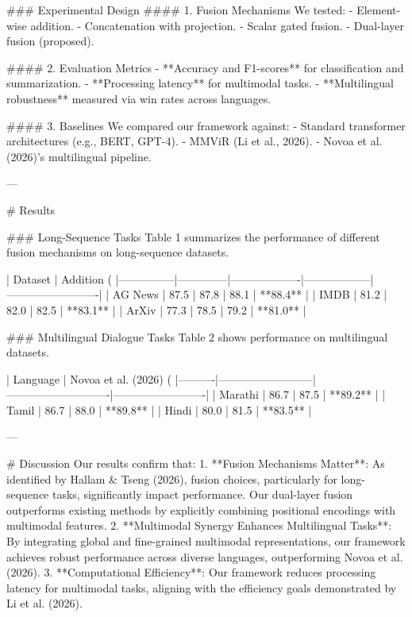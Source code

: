 ### Experimental Design  
#### 1. Fusion Mechanisms
We tested:
- Element-wise addition.
- Concatenation with projection.
- Scalar gated fusion.
- Dual-layer fusion (proposed).

#### 2. Evaluation Metrics  
- **Accuracy and F1-scores** for classification and summarization.
- **Processing latency** for multimodal tasks.
- **Multilingual robustness** measured via win rates across languages.

#### 3. Baselines  
We compared our framework against:
- Standard transformer architectures (e.g., BERT, GPT-4).
- MMViR (Li et al., 2026).
- Novoa et al. (2026)'s multilingual pipeline.

---

# Results  

### Long-Sequence Tasks  
Table 1 summarizes the performance of different fusion mechanisms on long-sequence datasets.

| Dataset       | Addition (%
|---------------|--------------|-------------------|------------------|-------------------------|
| AG News       | 87.5         | 87.8              | 88.1             | **88.4**               |
| IMDB          | 81.2         | 82.0              | 82.5             | **83.1**               |
| ArXiv         | 77.3         | 78.5              | 79.2             | **81.0**               |

### Multilingual Dialogue Tasks  
Table 2 shows performance on multilingual datasets.

| Language | Novoa et al. (2026) (%
|----------|--------------------------|----------------------------|-------------------------|
| Marathi  | 86.7                    | 87.5                       | **89.2**               |
| Tamil    | 86.7                    | 88.0                       | **89.8**               |
| Hindi    | 80.0                    | 81.5                       | **83.5**               |

---

# Discussion  
Our results confirm that:
1. **Fusion Mechanisms Matter**: As identified by Hallam & Tseng (2026), fusion choices, particularly for long-sequence tasks, significantly impact performance. Our dual-layer fusion outperforms existing methods by explicitly combining positional encodings with multimodal features.
2. **Multimodal Synergy Enhances Multilingual Tasks**: By integrating global and fine-grained multimodal representations, our framework achieves robust performance across diverse languages, outperforming Novoa et al. (2026).
3. **Computational Efficiency**: Our framework reduces processing latency for multimodal tasks, aligning with the efficiency goals demonstrated by Li et al. (2026).

